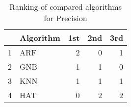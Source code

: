 \begin{table}
\footnotesize
\caption{Ranking of compared algorithms for Precision}
\label{tab:places Precision}
\begin{tabular}{llrrr}
\hline
 & Algorithm & 1st & 2nd & 3rd \\
\hline
1 & ARF & 2 & 0 & 1 \\
2 & GNB & 1 & 1 & 0 \\
3 & KNN & 1 & 1 & 1 \\
4 & HAT & 0 & 2 & 2 \\
\hline
\end{tabular}
\end{table}
